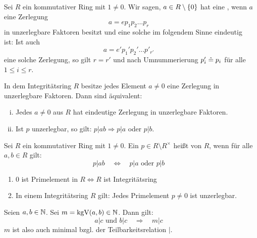 \begin{defn} \label{def_1.5}
	Sei $R$ ein kommutativer Ring mit $1 \neq 0$. Wir sagen, $a \in R \setminus \{0\}$ hat eine  , wenn $a$ eine Zerlegung
	\[ a = ep_1p_2 \dots p_r \]
	in unzerlegbare Faktoren besitzt und eine solche im folgendem Sinne eindeutig ist: Ist auch
	\[ a = e'p_1'p_2'\dots p'_{r'} \]
	eine solche Zerlegung, so gilt $r = r'$ und nach Umnummerierung $p_i' \mathrel{\hat=} p_i$ für alle $1 \leq i \leq r$.
\end{defn}

\begin{falko}\label{F1.4}
	In dem Integritätsring $R$ besitze jedes Element $a \neq 0$ eine Zerlegung in unzerlegbare Faktoren. Dann sind äquivalent: \begin{enumerate}[(i)]
		\item Jedes $a \neq 0$ aus $R$ hat eindeutige Zerlegung in unzerlegbare Faktoren.
		\item Ist $p$ unzerlegbar, so gilt: $p | ab \Rightarrow p | a$ oder $p | b$.
	\end{enumerate}
\end{falko}

\begin{defn}[Primelement] \label{def_1.6}
	Sei $R$ ein kommutativer Ring mit $1 \neq 0$. Ein $p \in R\setminus R^\times$ heißt  von $R$, wenn für alle $a, b \in R$ gilt:
	\begin{equation}
		p | ab \quad \Leftrightarrow \quad p | a \text{ oder } p | b \label{eq_def_1.6}
	\end{equation}
\end{defn}

	\begin{enumerate}[1)]
		\item $0$ ist Primelement in $R \Leftrightarrow R$ ist Integritätsring
		\item In einem Integritätsring $R$ gilt: Jedes Primelement $p \neq 0$ ist unzerlegbar.
	\end{enumerate}

\begin{lemma}
	Seien $a, b \in \mathbb{N}$. Sei $m = \operatorname{kgV}(a,b) \in \mathbb{N}$. Dann gilt:
	\[ a|c \text{ und } b|c \quad \Rightarrow \quad m | c \]
	$m$ ist also auch minimal bzgl. der Teilbarkeitsrelation $|$.
\end{lemma}

\newpage